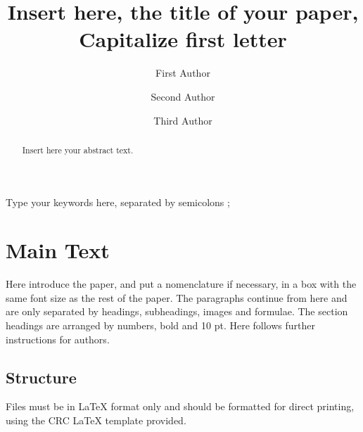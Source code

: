 \documentclass[3p,times,procedia]{elsarticle}
\begin{document}
\begin{frontmatter}
\title{Insert here, the title of your paper, Capitalize first letter}
\author[a]{First Author}
\author[b]{Second Author}
\author[a,b]{Third Author}
\address[a]{First affiliation, Address, City and Postcode, Country}
\address[b]{Second affiliation, Address, City and Postcode, Country}
\begin{abstract}
Insert here your abstract text.
\end{abstract}
\begin{keyword}
Type your keywords here, separated by semicolons ;
\end{keyword}
\end{frontmatter}
\section{Main Text}
Here introduce the paper, and put a nomenclature if necessary, in a box with the same font size as the rest of the paper. The paragraphs continue from here and are only separated by headings, subheadings, images and formulae. The section headings are arranged by numbers, bold and 10 pt. Here follows further instructions for authors.
\subsection{Structure}
Files must be in LaTeX format only and should be formatted for direct printing, using the CRC LaTeX template provided.
\end{document}
